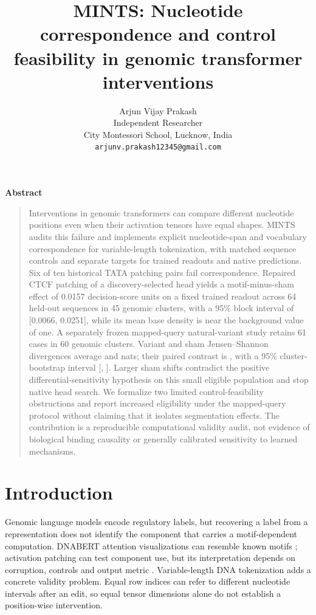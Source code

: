 \documentclass[10pt,letterpaper]{article}
\title{MINTS: Nucleotide correspondence and control feasibility in genomic transformer interventions}
\author{Arjun Vijay Prakash\\Independent Researcher\\City Montessori School, Lucknow, India\\\texttt{arjunv.prakash12345@gmail.com}}\date{}
\renewenvironment{abstract}{\begin{center}\bfseries Abstract\end{center}\begin{quote}\normalsize}{\end{quote}}
\begin{document}
\maketitle
\begin{abstract}
Interventions in genomic transformers can compare different nucleotide positions even when their activation tensors have equal shapes. MINTS audits this failure and implements explicit nucleotide-span and vocabulary correspondence for variable-length tokenization, with matched sequence controls and separate targets for trained readouts and native predictions. Six of ten historical TATA patching pairs fail correspondence. Repaired CTCF patching of a discovery-selected head yields a motif-minus-sham effect of 0.0157 decision-score units on a fixed trained readout across 64 held-out sequences in 45 genomic clusters, with a 95\% block interval of [0.0066, 0.0251], while its mean base density is near the background value of one. A separately frozen mapped-query natural-variant study retains 61 cases in 60 genomic clusters. Variant and sham Jensen--Shannon divergences average \MappedVariantJS{} and \MappedShamJS{} nats; their paired contrast is \MappedMean{}, with a 95\% cluster-bootstrap interval [\MappedLow{}, \MappedHigh{}]. Larger sham shifts contradict the positive differential-sensitivity hypothesis on this small eligible population and stop native head search. We formalize two limited control-feasibility obstructions and report increased eligibility under the mapped-query protocol without claiming that it isolates segmentation effects. The contribution is a reproducible computational validity audit, not evidence of biological binding causality or generally calibrated sensitivity to learned mechanisms.
\end{abstract}
\section{Introduction}
Genomic language models encode regulatory labels, but recovering a label from a representation does not identify the component that carries a motif-dependent computation. DNABERT attention visualizations can resemble known motifs \citep{ji2021dnabert}; activation patching can test component use, but its interpretation depends on corruption, controls and output metric \citep{heimersheim2024patching,zhang2024metrics}. Variable-length DNA tokenization adds a concrete validity problem. Equal row indices can refer to different nucleotide intervals after an edit, so equal tensor dimensions alone do not establish a position-wise intervention.
\end{document}
